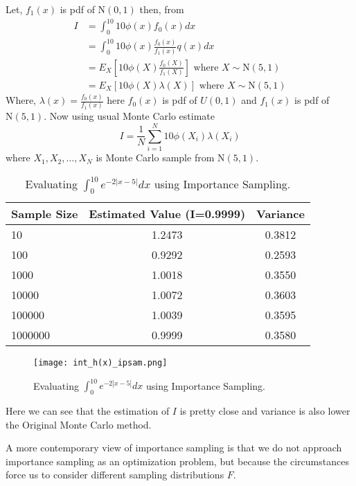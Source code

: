 \begin{example}
    Let, $f_1(x)$ is pdf of $\text{N}(0,1)$ then, from 
	\begin{align*}
		I & = \int_{0}^{10} 10\phi(x) f_0(x) dx                                            \\
		  & = \int_{0}^{10} 10 \phi(x) \frac{f_0(x)}{f_1(x)} q(x)dx                          \\
          & = E_X\left[ 10 \phi(X) \frac{f_0(X)}{f_1(X)} \right] \text{ where } X\sim \text{N}(5,1) \\
          & = E_X\left[ 10 \phi(X) \lambda(X) \right]\text{ where } X\sim \text{N}(5,1)
	\end{align*}
    Where, $\lambda(x) = \frac{f_0(x)}{f_1(x)}$ here $f_0(x)$ is pdf of $U(0,1)$ and $f_1(x)$ is pdf of $\text{N}(5,1)$. Now using usual Monte Carlo estimate
	\[
		I = \frac{1}{N} \sum_{i = 1}^{N} 10 \phi(X_i) \lambda(X_i)
	\]
    where $X_1, X_2,\ldots,X_N$ is Monte Carlo sample from $\text{N}(5,1)$.
	\begin{table}[H]
		\centering
		\begin{tabular}{l c c}
			\hline
			Sample Size & Estimated Value (I=0.9999) & Variance \\
			\hline
			10          & 1.2473                     & 0.3812   \\
			100         & 0.9292                     & 0.2593   \\
			1000        & 1.0018                     & 0.3550   \\
			10000       & 1.0072                     & 0.3603   \\
			100000      & 1.0039                     & 0.3595   \\
			1000000     & 0.9999                     & 0.3580   \\
			\hline
		\end{tabular}
		\caption{Evaluating $\int_{0}^{10} e^{-2 |x-5|} dx$ using Importance Sampling.}
		\label{tab:mytable}
	\end{table}
	
	\begin{figure}[H]
		\centering
		\texttt{[image: int\_h(x)\_ipsam.png]}
		\caption{Evaluating $\int_{0}^{10} e^{-2 |x-5|} dx$ using Importance Sampling.}
		\label{fig:impotrancesampling1}
	\end{figure}
	Here we can see that the estimation of $I$ is pretty close and variance is also
	lower the Original Monte Carlo method.
\end{example}

A more contemporary view of importance sampling is that we do not approach
importance sampling as an optimization problem, but because the circumstances
force us to consider different sampling distributions $F$.

